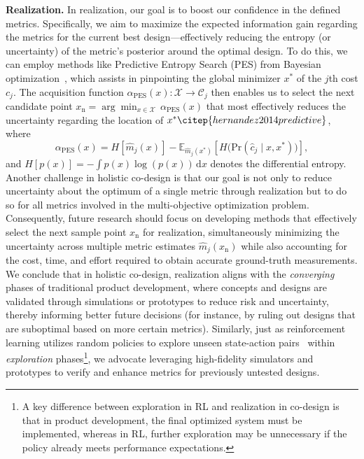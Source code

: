 \textbf{Realization.}
In realization, our goal is to boost our confidence in the defined metrics. Specifically, we aim to maximize the expected information gain regarding the metrics for the current best design—effectively reducing the entropy (or uncertainty) of the metric’s posterior around the optimal design. To do this, we can employ methods like Predictive Entropy Search (PES) from Bayesian optimization~\citep{hernandez2014predictive}, which assists in pinpointing the global minimizer $x^*$ of the $j$th cost $c_j$. The acquisition function $\alpha_\mathrm{PES}(x): \mathcal{X} \to \mathcal{C}_j$ then enables us to select the next candidate point
$x_\mathrm{n} = \arg \min_{x \in \mathcal{X}} \, \alpha_\mathrm{PES}(x)$
that most effectively reduces the uncertainty regarding the location of $x^*\citep{hernandez2014predictive}$, where
\begin{equation}
    \alpha_\mathrm{PES}(x) = H[\hat{m}_j(x)] - \mathbb{E}_{\hat{m}_j(x^*)} \left[ H\big(\mathrm{Pr}(\hat{c}_j \mid x,x^*)\big) \right],
\end{equation}
and $H[p(x)] = -\int p(x) \log(p(x)) \, \mathrm{d}x$ denotes the differential entropy. 
Another challenge in holistic co-design is that our goal is not only to reduce uncertainty about the optimum of a single metric through realization but to do so for all metrics involved in the multi-objective optimization problem. Consequently, future research should focus on developing methods that effectively select the next sample point $x_\mathrm{n}$ for realization, simultaneously minimizing the uncertainty across multiple metric estimates $\hat{m}_j(x_\mathrm{n})$ while also accounting for the cost, time, and effort required to obtain accurate ground-truth measurements.
We conclude that in holistic co-design, realization aligns with the \emph{converging} phases of traditional product development, where concepts and designs are validated through simulations or prototypes to reduce risk and uncertainty, thereby informing better future decisions (for instance, by ruling out designs that are suboptimal based on more certain metrics). Similarly, just as reinforcement learning utilizes random policies to explore unseen state-action pairs~\citep{sutton1998reinforcement} within \emph{exploration} phases\footnote{A key difference between exploration in \gls{RL} and realization in co-design is that in product development, the final optimized system must be implemented, whereas in \gls{RL}, further exploration may be unnecessary if the policy already meets performance expectations.}, we advocate leveraging high-fidelity simulators and prototypes to verify and enhance metrics for previously untested designs.

